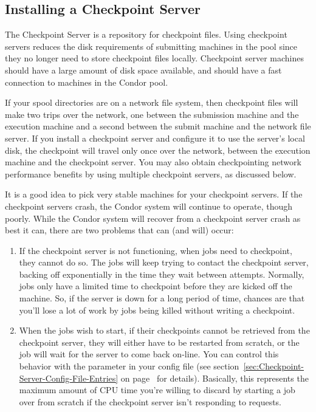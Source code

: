 \subsection{\label{sec:Ckpt-Server}
Installing a Checkpoint Server}
The Checkpoint Server is a repository for checkpoint files.
Using checkpoint servers reduces the disk requirements of submitting
machines in the pool since they no longer need to store checkpoint
files locally.
Checkpoint server machines should have a large amount of disk space
available, and should have a fast connection to machines in the Condor
pool.

If your spool directories are on a network file system, then
checkpoint files will make two trips over the network, one between the
submission machine and the execution machine and a second between the
submit machine and the network file server.
If you install a checkpoint server and configure it to use the
server's local disk, the checkpoint will travel only once over the
network, between the execution machine and the checkpoint server.
You may also obtain checkpointing network performance benefits by
using multiple checkpoint servers, as discussed below.

\Note It is a good idea to pick very stable machines for your checkpoint
servers.
If the checkpoint servers crash, the Condor system will continue to
operate, though poorly.  
While the Condor system will recover from a checkpoint server crash
as best it can, there are two problems that can (and will) occur:
\begin{enumerate}

\item If the checkpoint server is not functioning, when jobs need to
checkpoint, they cannot do so.
The jobs will keep trying to contact the checkpoint server, backing
off exponentially in the time they wait between attempts.
Normally, jobs only have a limited time to checkpoint before they are
kicked off the machine.
So, if the server is down for a long period of time, chances are that
you'll lose a lot of work by jobs being killed without writing a
checkpoint. 

\item When the jobs wish to start, if their checkpoints cannot be
retrieved from 
the checkpoint server, they will either have to be restarted from
scratch, or the job will wait for the server to come back on-line.
You can control this behavior with the
 parameter in your config file (see
section~\ref{sec:Checkpoint-Server-Config-File-Entries} on
page~\pageref{sec:Checkpoint-Server-Config-File-Entries} for details).
Basically, this represents the maximum amount of CPU time you're
willing to discard by starting a job over from scratch if the
checkpoint server isn't responding to requests.

\end{enumerate}

